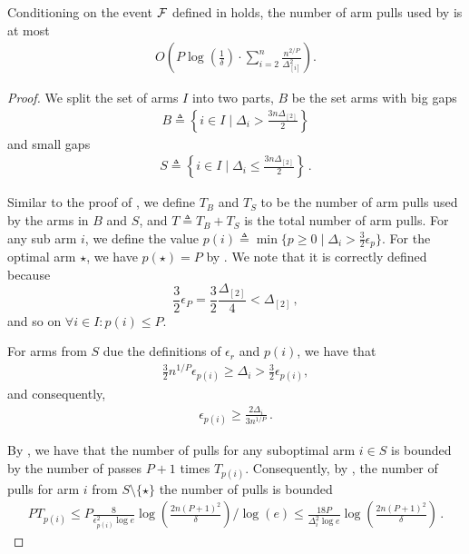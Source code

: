 \begin{lemma}\label{lem:improved-sample-complexity}
	Conditioning on the event \(\mathcal{F}\) defined in  holds, the number of arm pulls used by  is at most 
	\begin{align*}
		O\left(P \log\left( \frac{1}{\delta}\right) \cdot \sum_{i = 2}^n \frac{n^{2/P}}{\Delta^2_{[i]}}\right).
	\end{align*}
\end{lemma}

\begin{proof}
	We split the set of arms \(I\) into two parts, \(B\) be the set arms with big gaps 
	\begin{align*}%
		B \triangleq \left\{i \in I \mid \Delta_i > \frac{3n\Delta_{[2]}}{2}\right\}
	\end{align*}
	and small gaps
	\begin{align*}%
		S \triangleq \left\{ i \in I \mid \Delta_i \le \frac{3n\Delta_{[2]}}{2}\right\}\,.
	\end{align*}
	
	Similar to the proof of , we define $T_{B}$ and $T_{S}$ to be the number of arm pulls used by the arms in $B$ and $S$, and $T\triangleq T_B + T_S$ is the total number of arm pulls. For any sub arm \(i\), we define the value \(p(i) \triangleq \min\{p \ge 0 \mid \Delta_i > \frac{3}{2}\epsilon_p\}\). For the optimal arm \(\star\), we have \(p(\star) = P\) by . We note that it is correctly defined because 
	\[\frac{3}{2}\epsilon_P = \frac{3}{2}\frac{\Delta_{[2]}}{4} < \Delta_{[2]}\,,\]
	and so on \(\forall{i \in I} : p(i) \le P\). 
	
	For arms from \(S\) due the definitions of \(\epsilon_r\) and \(p(i)\), we have that 
	\begin{align*}
		\frac{3}{2} n^{1/P} \epsilon_{p(i)} \ge \Delta_i > \frac{3}{2} \epsilon_{p(i)},
	\end{align*}
	and consequently, 
	\begin{align}\label{eq:improved-eps-lower}
		\epsilon_{p(i)} \ge \frac{2\Delta_i}{3 n^{1/P}}\,.
	\end{align}
	
	By , we have that the number of pulls for any suboptimal arm \(i \in S\) is bounded by the number of passes \(P + 1\) times \(T_{p(i)}\).  Consequently, by , the number of pulls for arm \(i\) from \(S \setminus \{\star\}\)  the number of pulls is bounded
	\begin{align}\label{eq:improved-bound-small-gap}
		P T_{p(i)} \le P \frac{8}{\epsilon^2_{p(i)} \log{e}} \log\left(\frac{2 n (P + 1)^2}{\delta}\right) / \log(e) \le \frac{18 P }{\Delta^2_i \log{e} } \log\left(\frac{2 n (P + 1)^2}{\delta}\right)\,.
	\end{align}
	

\end{proof}
